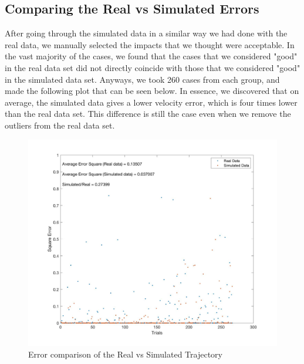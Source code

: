 \documentclass{article}
\begin{document}
\subsection{Comparing the Real vs Simulated Errors}
After going through the simulated data in a similar way we had done with the real data, we manually selected the impacts that we thought were acceptable. In the vast majority of the cases, we found that the cases that we considered "good" in the real data set did not directly coincide with those that we considered "good" in the simulated data set. Anyways, we took 260 cases from each group, and made the following plot that can be seen below. In essence, we discovered that on average, the simulated data gives a lower velocity error, which is four times lower than the real data set. This difference is still the case even when we remove the outliers from the real data set.

\begin{figure}[h!]
        \centering
        \includegraphics[scale=0.15]{Simulated vs Real.jpg}
        \caption{Error comparison of the Real vs Simulated Trajectory}
        \label{fig:RealvsSimError}
\end{figure}
\end{document}
